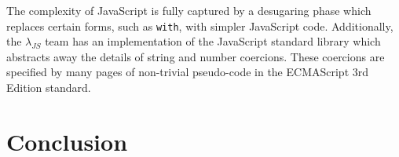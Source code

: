 \documentclass[10pt,letter,english]{article}
\newcommand{\js}[0]{JavaScript}
\newcommand{\lambdajs}[0]{$\lambda_{JS}$}
\begin{document}
The complexity of \js{} is fully captured by a desugaring phase which replaces
certain forms, such as \texttt{with}, with simpler \js{} code. Additionally, the
\lambdajs{} team has an implementation of the \js{} standard library which
abstracts away the details of string and number coercions. These coercions are
specified by many pages of non-trivial pseudo-code in the ECMAScript 3rd Edition
standard.

\section{Conclusion}



{}

\end{document}
